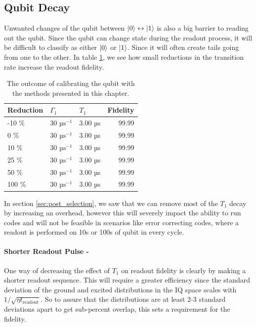 \subsection{Qubit Decay}
Unwanted changes of the qubit between $\ket{0}\leftrightarrow\ket{1}$ is also a big barrier to reading out the qubit. Since the qubit can change state during the readout process, it will be difficult to classify as either $\ket{0}$ or $\ket{1}$. Since it will often create tails going from one to the other. In table \ref{tab:decay_contribution_estimation}, we see how small reductions in the transition rate increase the readout fidelity. 

\begin{table}[h]
\centering
\caption{The outcome of calibrating the qubit with the methods presented in this chapter.}
\begin{tabular}{lll|r}
\hline
\textbf{Reduction}         &  $\Gamma_1$                  &  $T_1$                & Fidelity\\ \hline
-10 \%                     &  30 $\text{µs}^{-1}$         &  3.00 µs             &  99.99\\
0   \%                     &  30 $\text{µs}^{-1}$         &  3.00 µs             &  99.99\\
10  \%                     &  30 $\text{µs}^{-1}$         &  3.00 µs             &  99.99\\
25  \%                     &  30 $\text{µs}^{-1}$         &  3.00 µs             &  99.99\\
50  \%                     &  30 $\text{µs}^{-1}$         &  3.00 µs             &  99.99\\
100 \%                     &  30 $\text{µs}^{-1}$         &  3.00 µs             &  99.99\\
\end{tabular}
\label{tab:decay_contribution_estimation}
\end{table}

In section \ref{sec:post_selection}, we saw that we can remove most of the $T_1$ decay by increasing an overhead, however this will severely impact the ability to run codes and will not be feasible in scenarios like error correcting codes, where a readout is performed on 10s or 100s of qubit in every cycle.   

\paragraph{Shorter Readout Pulse - } One way of decreasing the effect of $T_1$ on readout fidelity is clearly by making a shorter readout sequence. This will require a greater efficiency since the standard deviation of the ground and excited distributions in the IQ space scales with $1 / \sqrt{\eta t_{\text{readout}}}$. So to assure that the distributions are at least 2-3 standard deviations apart to get sub-percent overlap, this sets a requirement for the fidelity.

